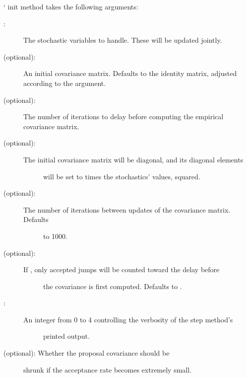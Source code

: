 \documentclass[letterpaper,10pt,english]{sphinxmanual}
\begin{document}
` init method takes the following arguments:
\begin{description}
\item[{:}] \leavevmode
The stochastic variables to handle. These will be updated jointly.

\item[{ (optional):}] \leavevmode
An initial covariance matrix. Defaults to the identity matrix, adjusted
according to the  argument.

\item[{ (optional):}] \leavevmode
The number of iterations to delay before computing the empirical covariance
matrix.

\item[{ (optional):}] \leavevmode\begin{description}
\item[{The initial covariance matrix will be diagonal, and its diagonal elements}] \leavevmode
will be set to  times the stochastics' values, squared.

\end{description}

\item[{ (optional):}] \leavevmode\begin{description}
\item[{The number of iterations between updates of the covariance matrix. Defaults}] \leavevmode
to 1000.

\end{description}

\item[{ (optional):}] \leavevmode\begin{description}
\item[{If , only accepted jumps will be counted toward the delay before}] \leavevmode
the covariance is first computed. Defaults to .

\end{description}

\item[{:}] \leavevmode\begin{description}
\item[{An integer from 0 to 4 controlling the verbosity of the step method's}] \leavevmode
printed output.

\end{description}

\item[{ (optional): Whether the proposal covariance should be}] \leavevmode
shrunk if the acceptance rate becomes extremely small.

\end{description}
\end{document}
